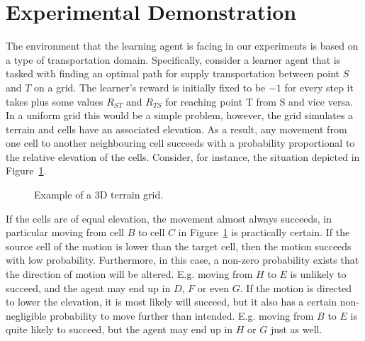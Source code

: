 \section{Experimental Demonstration}\label{sec: experiments}
The environment that the learning agent is facing in our experiments
is based on a type of transportation domain. Specifically, consider a
learner agent that is tasked with finding an optimal path for supply
transportation between point $S$ and $T$ on a grid. The learner's
reward is initially fixed to be $-1$ for every step it takes plus some
values $R_{ST}$ and $R_{TS}$ for reaching point T from S and vice
versa. In a uniform grid this would be a simple problem, however, the
grid simulates a terrain and cells have an associated elevation.  As a
result, any movement from one cell to another neighbouring cell
succeeds with a probability proportional to the relative elevation of
the cells. Consider, for instance, the situation depicted in
Figure~\ref{exp_motion}.

\begin{figure}[ht]
\centerline{}
\caption{\label{exp_motion}Example of a 3D terrain grid.}
\end{figure}

If the cells are of equal elevation, the movement almost always
succeeds, in particular moving from cell $B$ to cell $C$ in
Figure~\ref{exp_motion} is practically certain. If the source cell of
the motion is lower than the target cell, then the motion succeeds
with low probability. Furthermore, in this case, a non-zero
probability exists that the direction of motion will be
altered. E.g. moving from $H$ to $E$ is unlikely to succeed, and the
agent may end up in $D$, $F$ or even $G$. If the motion is directed to
lower the elevation, it is most likely will succeed, but it also has a
certain non-negligible probability to move further than
intended. E.g. moving from $B$ to $E$ is quite likely to succeed, but
the agent may end up in $H$ or $G$ just as well.

